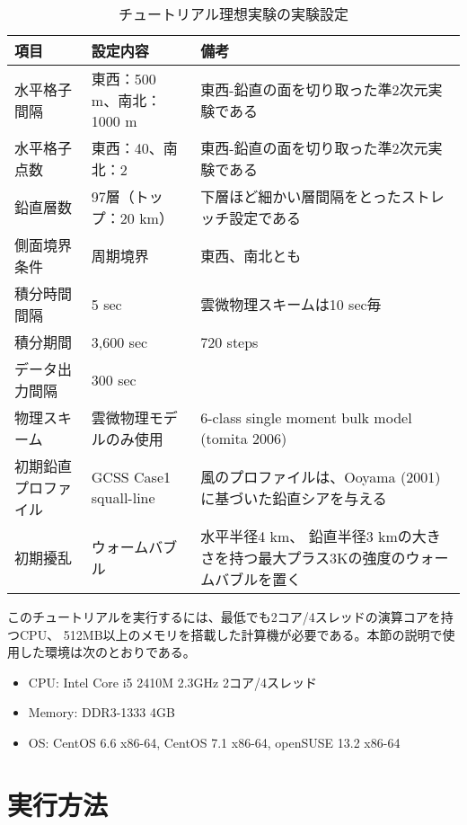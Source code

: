 \begin{table}[htb]
\begin{center}
\caption{チュートリアル理想実験の実験設定}
\begin{tabularx}{150mm}{|l|l|X|} \hline
 \rowcolor[gray]{0.9} 項目 & 設定内容 & 備考 \\ \hline
 水平格子間隔 & 東西：500 m、南北：1000 m & 東西-鉛直の面を切り取った準2次元実験である \\ \hline
 水平格子点数 & 東西：40、南北：2 & 東西-鉛直の面を切り取った準2次元実験である \\ \hline
 鉛直層数     & 97層（トップ：20 km）& 下層ほど細かい層間隔をとったストレッチ設定である \\ \hline
 側面境界条件 & 周期境界 & 東西、南北とも \\ \hline
 積分時間間隔 & 5 sec      & 雲微物理スキームは10 sec毎 \\ \hline
 積分期間     & 3,600 sec  & 720 steps \\ \hline
 データ出力間隔 & 300 sec  &  \\ \hline
 物理スキーム & 雲微物理モデルのみ使用 &
 6-class single moment bulk model (tomita 2006) \\ \hline
 初期鉛直プロファイル & GCSS Case1 squall-line &
 風のプロファイルは、Ooyama (2001)に基づいた鉛直シアを与える \\ \hline
 初期擾乱 & ウォームバブル & 水平半径4 km、
 鉛直半径3 kmの大きさを持つ最大プラス3Kの強度のウォームバブルを置く\\ \hline
\end{tabularx}
\label{tab:setting_ideal}
\end{center}
\end{table}

このチュートリアルを実行するには、最低でも2コア/4スレッドの演算コアを持つCPU、
512MB以上のメモリを搭載した計算機が必要である。本節の説明で使用した環境は次のとおりである。
\begin{itemize}
\item CPU: Intel Core i5 2410M 2.3GHz 2コア/4スレッド
\item Memory: DDR3-1333 4GB
\item OS: CentOS 6.6 x86-64, CentOS 7.1 x86-64, openSUSE 13.2 x86-64
\end{itemize}


\section{実行方法}

